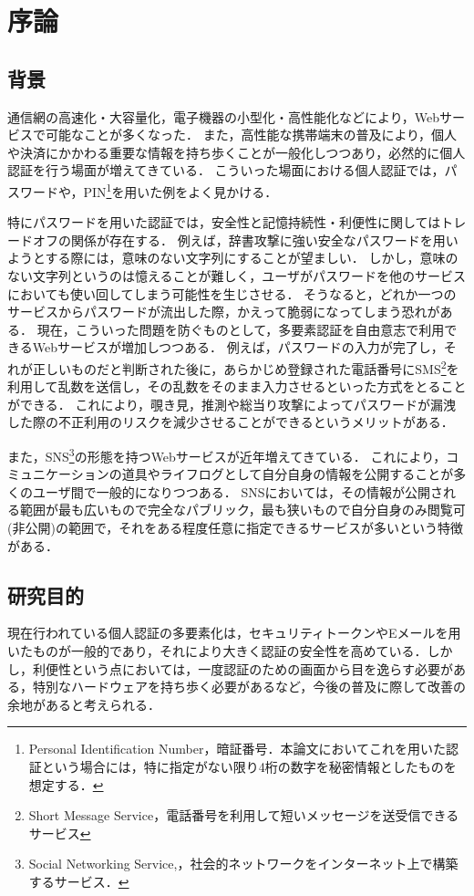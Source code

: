 \chapter{序論}\label{chap:introduction}

\section{背景}
通信網の高速化・大容量化，電子機器の小型化・高性能化などにより，Webサービスで可能なことが多くなった．
また，高性能な携帯端末の普及により，個人や決済にかかわる重要な情報を持ち歩くことが一般化しつつあり，必然的に個人認証を行う場面が増えてきている．
こういった場面における個人認証では，パスワードや，PIN\footnote{Personal Identification Number，暗証番号．本論文においてこれを用いた認証という場合には，特に指定がない限り4桁の数字を秘密情報としたものを想定する．}を用いた例をよく見かける．

特にパスワードを用いた認証では，安全性と記憶持続性・利便性に関してはトレードオフの関係が存在する．
例えば，辞書攻撃に強い安全なパスワードを用いようとする際には，意味のない文字列にすることが望ましい．
しかし，意味のない文字列というのは憶えることが難しく，ユーザがパスワードを他のサービスにおいても使い回してしまう可能性を生じさせる．
そうなると，どれか一つのサービスからパスワードが流出した際，かえって脆弱になってしまう恐れがある．
現在，こういった問題を防ぐものとして，多要素認証を自由意志で利用できるWebサービスが増加しつつある．
例えば，パスワードの入力が完了し，それが正しいものだと判断された後に，あらかじめ登録された電話番号にSMS\footnote{Short Message Service，電話番号を利用して短いメッセージを送受信できるサービス}を利用して乱数を送信し，その乱数をそのまま入力させるといった方式をとることができる．
これにより，覗き見，推測や総当り攻撃によってパスワードが漏洩した際の不正利用のリスクを減少させることができるというメリットがある．

また，SNS\footnote{Social Networking Service,，社会的ネットワークをインターネット上で構築するサービス．}の形態を持つWebサービスが近年増えてきている．
これにより，コミュニケーションの道具やライフログとして自分自身の情報を公開することが多くのユーザ間で一般的になりつつある．
SNSにおいては，その情報が公開される範囲が最も広いもので完全なパブリック，最も狭いもので自分自身のみ閲覧可(非公開)の範囲で，それをある程度任意に指定できるサービスが多いという特徴がある．

\section{研究目的}
現在行われている個人認証の多要素化は，セキュリティトークンやEメールを用いたものが一般的であり，それにより大きく認証の安全性を高めている．しかし，利便性という点においては，一度認証のための画面から目を逸らす必要がある，特別なハードウェアを持ち歩く必要があるなど，今後の普及に際して改善の余地があると考えられる．

